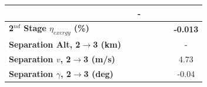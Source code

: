 \begin{table}[ht]
\begin{tabular}{l c c c c c c}
	& \firstsecondSeparationgammamFuelOneHundredTen
	& -
	\\
	\hline 
	\textbf{2$^{nd}$ Stage $\eta_{exergy}$ (\%)}
	& \textbf{\secondExergyEffmFuelNinety}
	& \textbf{\secondExergyEffmFuelNinetyFive}
	& \textbf{\secondExergyEffmFuelStandard}
	& \textbf{\secondExergyEffmFuelOneHundredFive}
	& \textbf{\secondExergyEffmFuelOneHundredTen}
	& \textbf{-0.013}
	\\
	\textbf{Separation Alt, 2$\rightarrow$3 (km)}
	& \secondthirdSeparationAltmFuelNinety
	& \secondthirdSeparationAltmFuelNinetyFive
	& \secondthirdSeparationAltmFuelStandard
	& \secondthirdSeparationAltmFuelOneHundredFive
	& \secondthirdSeparationAltmFuelOneHundredTen
	& -
	\\
	\textbf{Separation $v$, 2$\rightarrow$3 (m/s)}
	& \secondthirdSeparationvmFuelNinety
	& \secondthirdSeparationvmFuelNinetyFive
	& \secondthirdSeparationvmFuelStandard
	& \secondthirdSeparationvmFuelOneHundredFive
	& \secondthirdSeparationvmFuelOneHundredTen
	&4.73
	\\
	\textbf{Separation $\gamma$, 2$\rightarrow$3 (deg)}
	& \secondthirdSeparationgammamFuelNinety
	& \secondthirdSeparationgammamFuelNinetyFive
	& \secondthirdSeparationgammamFuelStandard
	& \secondthirdSeparationgammamFuelOneHundredFive
	& \secondthirdSeparationgammamFuelOneHundredTen
	&-0.04
	\\


\end{tabular}
\end{table}
